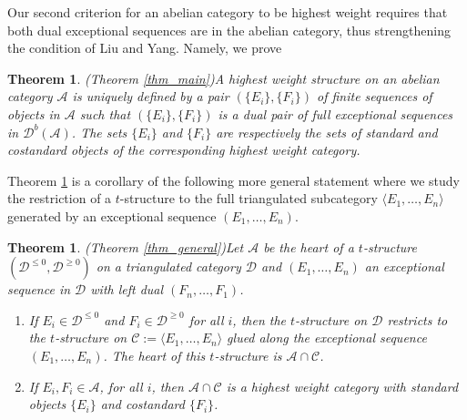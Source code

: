 \documentclass[12pt,a4paper]{amsart}
\newcommand{\aA}{{\mathcal{A}}}
\newcommand{\cC}{{\mathcal{C}}}
\newcommand{\dD}{{\mathcal{D}}}
\newcommand{\la}{\lambda}
\newcommand{\tr}{{\mbox{$t$-struc}\-tu\-r}}
\newcommand{\Hom}{\mathop{\textrm{Hom}}\nolimits}
\newtheorem{THM}[LEM]{Theorem}
\theoremstyle{definition}
\begin{document}
	Our second criterion for an abelian category to be highest weight requires that both dual exceptional sequences are in the abelian category, thus strengthening the condition of Liu and Yang. Namely, we prove
	
	\begin{THM}(Theorem \ref{thm_main})\label{thm_A}
		A highest weight structure on an abelian category $\aA$ is uniquely defined by a pair  $(\{ E_i \},  \{ F_i \})$ of finite sequences of objects in $\aA$ such that
		 $(\{ E_i \},  \{ F_i \})$ is a dual pair of full exceptional sequences in $\dD^b(\aA)$.
		 The sets $\{ E_i \}$ and $\{ F_i \}$ are respectively the sets of standard and costandard objects of the corresponding highest weight category.
		
	\end{THM}


Theorem \ref{thm_A} is a corollary of the following more general statement where we study the restriction of a \tr e to the full triangulated subcategory $\langle E_1,\ldots,E_n\rangle$ generated by an exceptional sequence $(E_1,\ldots, E_n)$.
\begin{THM}(Theorem \ref{thm_general})\label{thm_intro_gen}
Let $\aA$ be the heart of a \tr e $(\dD^{\leq 0}, \dD^{\geq 0})$ on a triangulated category $\dD$ and $(E_1,\ldots, E_n)$ an exceptional sequence in $\dD$ with left dual $(F_n,\ldots, F_1)$. 
	\begin{enumerate}
		\item If $E_i\in \dD^{\leq 0}$ and $F_i \in \dD^{\geq 0}$ for all $i$, then the \tr e on $\dD$ restricts to the  	\tr e on $\cC:= \langle E_1,\ldots,E_n\rangle$ glued along the exceptional sequence $(E_1,\ldots, E_n)$. The heart of this \tr e is $\aA \cap \cC$. 
		\item If $E_i, F_i\in \aA$, for all $i$, then $\aA\cap \cC$ is a highest weight category with standard objects $\{E_i\}$ and costandard $\{F_i\}$.
	\end{enumerate}
\end{THM} 
\end{document}
